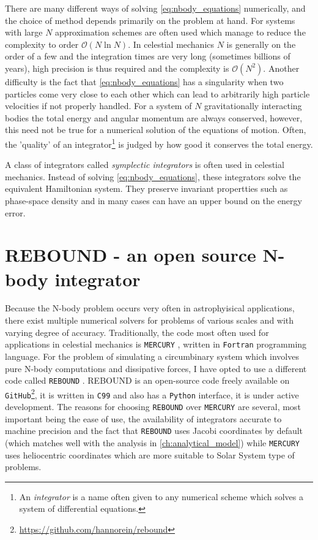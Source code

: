 There are many different ways of solving \cref{eq:nbody_equations} numerically,
and the choice of method depends primarily on the problem at hand. For systems
with large $N$
approximation schemes are often used which manage to reduce the complexity
to order $\mathcal{O}(N\ln N)$. In celestial mechanics $N$ is generally on
the order of a few and the integration times are very long (sometimes 
billions of years), high precision is thus required and the complexity is 
$\mathcal{O}(N^2)$. Another difficulty is the fact that \cref{eq:nbody_equations}
has a singularity when two particles come very close to each other which
can lead to arbitrarily high particle velocities if not properly handled.
For a system of $N$ gravitationally interacting bodies the total energy 
and angular momentum are always conserved, however, this need not be true 
for a numerical solution of the equations of motion. Often, the 'quality'
of an integrator\footnote{An \emph{integrator} is a name often given to
any numerical scheme which solves a system of differential equations.}
is judged by how good it conserves the total energy.

A class of integrators called \emph{symplectic integrators} 
\citep{vogelaere,ruth,feng} is often used
in celestial mechanics. Instead of solving \cref{eq:nbody_equations}, these
integrators solve the equivalent Hamiltonian system. They preserve
invariant propertties such as phase-space density and in many cases
can have an upper bound on the energy error.
\section{REBOUND - an open source N-body integrator}
\label{sec:REBOUND - an open source N-body integrator}
Because the N-body problem occurs very often in astrophyisical applications,
there exist multiple numerical solvers for problems of various scales and 
with varying degree of accuracy. Traditionally, the code most often used for applications
in celestial mechanics is \texttt{MERCURY} \citep{chambers1997,chambers1999}, 
written in \texttt{Fortran} programming language.
For the problem of simulating a circumbinary system
which involves pure N-body computations and dissipative forces, I have 
opted to use a different code called \texttt{REBOUND} \citep{Rein2012}.
REBOUND is an open-source code freely available on \texttt{GitHub}\footnote{
    \url{https://github.com/hannorein/rebound}}, it is written in \texttt{C99}
and also has a \texttt{Python} interface, it is under active development.
The reasons for choosing \texttt{REBOUND} over \texttt{MERCURY} are several,
most important being the ease of use, the availability of 
integrators accurate to machine precision  and the fact that 
\texttt{REBOUND} uses Jacobi coordinates
by default (which matches well with the analysis in \cref{ch:analytical_model})
while \texttt{MERCURY} uses heliocentric coordinates which are more suitable to
Solar System type of problems.

